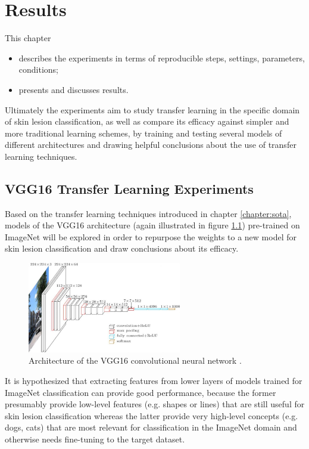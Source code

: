 \chapter{Results}
\label{chapter:results}

This chapter

\begin{itemize}
    \item describes the experiments in terms of reproducible steps, settings, parameters, conditions;
    \item presents and discusses results.
\end{itemize}

Ultimately the experiments aim to study transfer learning in the specific domain of skin lesion classification, as well as compare its efficacy against simpler and more traditional learning schemes, by training and testing several models of different architectures and drawing helpful conclusions about the use of transfer learning techniques.

\section{VGG16 Transfer Learning Experiments}

Based on the transfer learning techniques introduced in chapter \ref{chapter:sota}, models of the VGG16 architecture (again illustrated in figure \ref{fig:vgg16_reillustration}) pre-trained on ImageNet will be explored in order to repurpose the weights to a new model for skin lesion classification and draw conclusions about its efficacy.

\begin{figure}[ht]
    \centering
    \includegraphics[width=0.6\textwidth]{figs/vgg16.jpg}
    \caption{Architecture of the VGG16 convolutional neural network \cite{vgg16}.}
    \label{fig:vgg16_reillustration}
\end{figure}

It is hypothesized that extracting features from lower layers of models trained for ImageNet classification can provide good performance, because the former presumably provide low-level features (e.g. shapes or lines) that are still useful for skin lesion classification whereas the latter provide very high-level concepts (e.g. dogs, cats) that are most relevant for classification in the ImageNet domain and otherwise needs fine-tuning to the target dataset.

